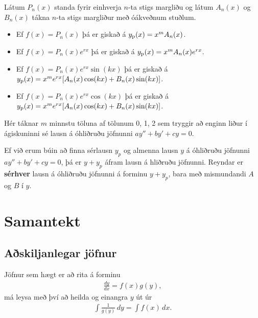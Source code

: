 \documentclass[b5paper,11pt,icelandic]{sphinxmanual}
\begin{document}
Látum \(P_n(x)\) standa fyrir einhverja \(n\)-ta stigs margliðu
og látum \(A_n(x)\) og \(B_n(x)\) tákna \(n\)-ta stigs
margliður með óákveðnum stuðlum.
\begin{itemize}
\item {} 
Ef \(f(x)=P_n(x)\) þá er giskað á \(y_{\rm p}(x)=x^mA_n(x)\).

\item {} 
Ef \(f(x)=P_n(x)e^{rx}\) þá er giskað á
\(y_{\rm p}(x)=x^mA_n(x)e^{rx}\).

\item {} 
Ef \(f(x)=P_n(x)e^{rx}\sin(kx)\) þá er giskað á
\(y_{\rm p}(x)=x^me^{rx}[A_n(x)\cos(kx)+B_n(x)\sin(kx)]\).

\item {} 
Ef \(f(x)=P_n(x)e^{rx}\cos(kx)\) þá er giskað á
\(y_{\rm p}(x)=x^me^{rx}[A_n(x)\cos(kx)+B_n(x)\sin(kx)]\).

\end{itemize}

Hér táknar \(m\) minnstu töluna af tölunum 0, 1, 2 sem tryggir að
enginn liður í ágiskuninni sé lausn á óhliðruðu jöfnunni
\(ay''+by'+cy=0\).

Ef við erum búin að finna sérlausn \(y_p\) og almenna lausn
\(y\) á óhliðruðu jöfnunni \(ay''+by'+cy=0\), þá er
\(y+y_p\) áfram lausn á hliðruðu jöfnunni. Reyndar er \textbf{sérhver}
lausn á óhliðruðu jöfnunni á forminu \(y+y_p\), bara
með mismundandi \(A\) og \(B\) í \(y\).


\section{Samantekt}
\label{kafli08:index-8}\label{kafli08:samantekt}

\subsection{Aðskiljanlegar jöfnur}
\label{kafli08:askiljanlegar-jofnur}
Jöfnur sem hægt er að rita á forminu
\begin{equation*}
\begin{split}\frac{dy}{dx} = f(x)g(y),\end{split}
\end{equation*}
má leysa með því að heilda og einangra \(y\) út úr
\begin{equation*}
\begin{split}\int \frac 1{g(y)}\, dy = \int f(x)\, dx.\end{split}
\end{equation*}
\end{document}
